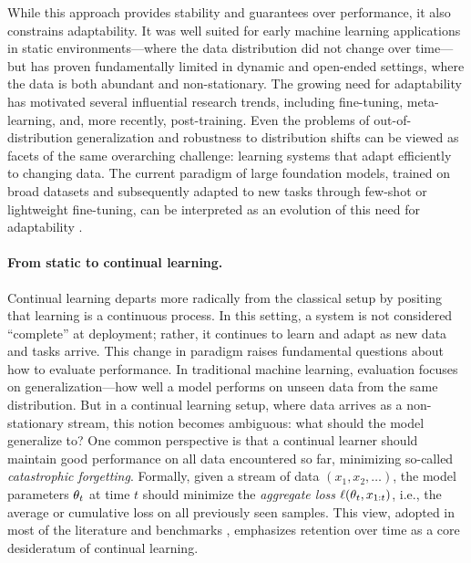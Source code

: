 \documentclass[10pt]{article} %
\begin{document}
While this approach provides stability and guarantees over performance, it also constrains adaptability. It was well suited for early machine learning applications in static environments---where the data distribution did not change over time---but has proven fundamentally limited in dynamic and open-ended settings, where the data is both abundant and non-stationary. The growing need for adaptability has motivated several influential research trends, including fine-tuning, meta-learning, and, more recently, post-training. Even the problems of out-of-distribution generalization and robustness to distribution shifts can be viewed as facets of the same overarching challenge: learning systems that adapt efficiently to changing data. The current paradigm of large foundation models, trained on broad datasets and subsequently adapted to new tasks through few-shot or lightweight fine-tuning, can be interpreted as an evolution of this need for adaptability \citep{brown_language_2020,radfordLearningTransferableVisual2021}.

\paragraph{From static to continual learning.}
Continual learning departs more radically from the classical setup by positing that learning is a continuous process. In this setting, a system is not considered “complete” at deployment; rather, it continues to learn and adapt as new data and tasks arrive. This change in paradigm raises fundamental questions about how to evaluate performance. In traditional machine learning, evaluation focuses on generalization—how well a model performs on unseen data from the same distribution. But in a continual learning setup, where data arrives as a non-stationary stream, this notion becomes ambiguous: what should the model generalize to?  
One common perspective is that a continual learner should maintain good performance on all data encountered so far, minimizing so-called \emph{catastrophic forgetting}. Formally, given a stream of data $(x_1, x_2, \dots)$, the model parameters $\theta_t$ at time $t$ should minimize the \emph{aggregate loss} $\ell(\theta_t, x_{1:t})$, i.e., the average or cumulative loss on all previously seen samples. This view, adopted in most of the literature and benchmarks \citep{delangeContinualLearningSurvey2022,buzzegaRethinkingExperienceReplay2020,vandevenThreeTypesIncremental2022}, emphasizes retention over time as a core desideratum of continual learning.
\end{document}
